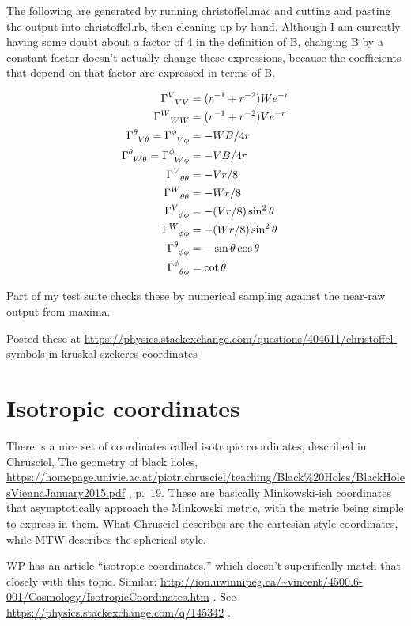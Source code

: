 \documentclass{article}
\begin{document}
The following are generated by running christoffel.mac and cutting and pasting the output into
christoffel.rb, then cleaning up by hand. Although I am currently having some doubt about a
factor of 4 in the definition of B,
changing B by a constant factor doesn't actually change these expressions, because the
coefficients that depend on that factor
are expressed in terms of B.

\begin{align}
\Gamma\indices{^V_V_V} &= (r^{-1}+r^{-2})We^{-r} \\
\Gamma\indices{^W_W_W} &= (r^{-1}+r^{-2})Ve^{-r} \\
\Gamma\indices{^\theta_V_\theta} = \Gamma\indices{^\phi_V_\phi} &= -WB/4r  \\
\Gamma\indices{^\theta_W_\theta} = \Gamma\indices{^\phi_W_\phi} &= -VB/4r  \\
%
\Gamma\indices{^V_\theta_\theta} &= -Vr/8\\
\Gamma\indices{^W_\theta_\theta} &= -Wr/8\\
\Gamma\indices{^V_\phi_\phi} &= -(Vr/8) \sin^2\theta\\
\Gamma\indices{^W_\phi_\phi} &= -(Wr/8) \sin^2\theta\\
%
\Gamma\indices{^\theta_\phi_\phi} &= -\sin\theta \cos\theta   \\
\Gamma\indices{^\phi_\theta_\phi} &= \cot\theta   
\end{align}

Part of my test suite checks
these by numerical sampling against the near-raw output from maxima.

Posted these at \url{https://physics.stackexchange.com/questions/404611/christoffel-symbols-in-kruskal-szekeres-coordinates}

\section{Isotropic coordinates}

There is a nice set of coordinates called isotropic coordinates,
described in Chrusciel, The geometry of black holes,
\url{https://homepage.univie.ac.at/piotr.chrusciel/teaching/Black%20Holes/BlackHolesViennaJanuary2015.pdf} ,
p.~19. These are basically Minkowski-ish coordinates that asymptotically approach the Minkowski
metric, with the metric being simple to express in them.  What Chrusciel describes are
the cartesian-style coordinates, while MTW describes the spherical style.

WP has an article ``isotropic coordinates,'' which doesn't superifically match that
closely with this topic. 
Similar: \url{http://ion.uwinnipeg.ca/~vincent/4500.6-001/Cosmology/IsotropicCoordinates.htm} .
See \url{https://physics.stackexchange.com/q/145342} .
\end{document}
